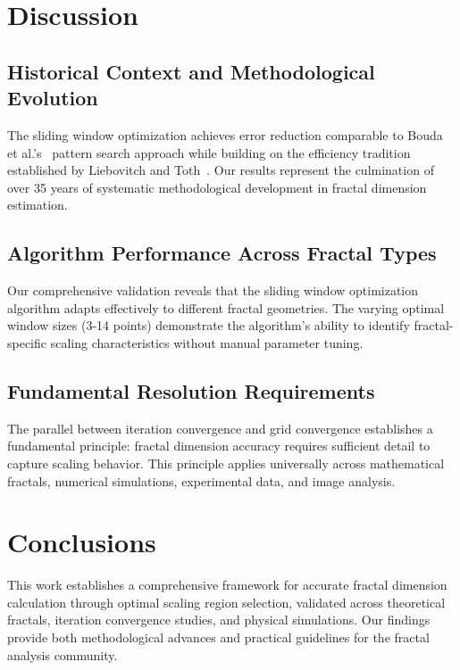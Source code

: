 \documentclass[preprint,12pt]{elsarticle}
\def\textbf#1{#1}%
\begin{document}
\section{Discussion}
\label{sec:discussion}

\subsection{Historical Context and Methodological Evolution}

The sliding window optimization achieves error reduction comparable to Bouda et al.'s~\cite{bouda2016} pattern search approach while building on the efficiency tradition established by Liebovitch and Toth~\cite{liebovitch1989}. Our results represent the culmination of over 35 years of systematic methodological development in fractal dimension estimation.

\subsection{Algorithm Performance Across Fractal Types}

Our comprehensive validation reveals that the sliding window optimization algorithm adapts effectively to different fractal geometries. The varying optimal window sizes (3-14 points) demonstrate the algorithm's ability to identify fractal-specific scaling characteristics without manual parameter tuning.

\subsection{Fundamental Resolution Requirements}

The parallel between iteration convergence and grid convergence establishes a fundamental principle: \textbf{fractal dimension accuracy requires sufficient detail to capture scaling behavior}. This principle applies universally across mathematical fractals, numerical simulations, experimental data, and image analysis.

\section{Conclusions}
\label{sec:conclusions}

This work establishes a comprehensive framework for accurate fractal dimension calculation through optimal scaling region selection, validated across theoretical fractals, iteration convergence studies, and physical simulations. Our findings provide both methodological advances and practical guidelines for the fractal analysis community.
\end{document}
